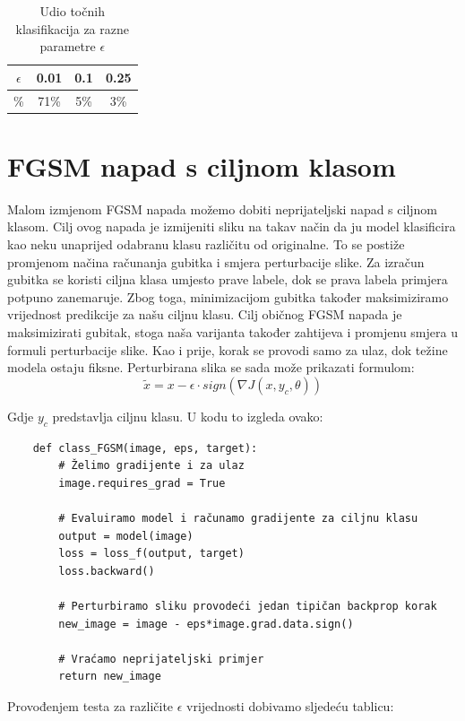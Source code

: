 \begin{table}[H]
	\centering
	\begin{tabular}{||c || c | c | c||} 
		\hline
		$\epsilon$ & 0.01 & 0.1 & 0.25 \\ [0.5ex] 
		\hline\hline
		\% & 71\% & 5\% & 3\% \\ 
		\hline
	\end{tabular}
	\caption{Udio točnih klasifikacija za razne parametre $\epsilon$}
\end{table}

\section{FGSM napad s ciljnom klasom}

Malom izmjenom FGSM napada možemo dobiti neprijateljski napad s ciljnom klasom. Cilj ovog napada je izmijeniti sliku na takav način da ju model klasificira kao neku unaprijed odabranu klasu različitu od originalne. To se postiže promjenom načina računanja gubitka i smjera perturbacije slike. Za izračun gubitka se koristi ciljna klasa umjesto prave labele, dok se prava labela primjera potpuno zanemaruje.  Zbog toga, minimizacijom gubitka također maksimiziramo vrijednost predikcije za našu ciljnu klasu. Cilj običnog FGSM napada je maksimizirati gubitak, stoga naša varijanta također zahtijeva i promjenu smjera u formuli perturbacije slike. Kao i prije, korak se provodi samo za ulaz, dok težine modela ostaju fiksne. Perturbirana slika se sada može prikazati formulom: 
\[\widetilde{x} = x - \epsilon\cdot sign\left(\nabla J(x, y_c, \theta)\right)\]

Gdje $y_c$ predstavlja ciljnu klasu. U kodu to izgleda ovako:

\begin{verbatim}
    def class_FGSM(image, eps, target):
        # Želimo gradijente i za ulaz
        image.requires_grad = True

        # Evaluiramo model i računamo gradijente za ciljnu klasu
        output = model(image)
        loss = loss_f(output, target)
        loss.backward()

        # Perturbiramo sliku provodeći jedan tipičan backprop korak
        new_image = image - eps*image.grad.data.sign()

        # Vraćamo neprijateljski primjer
        return new_image
\end{verbatim}

Provođenjem testa za različite $\epsilon$ vrijednosti dobivamo sljedeću tablicu:

